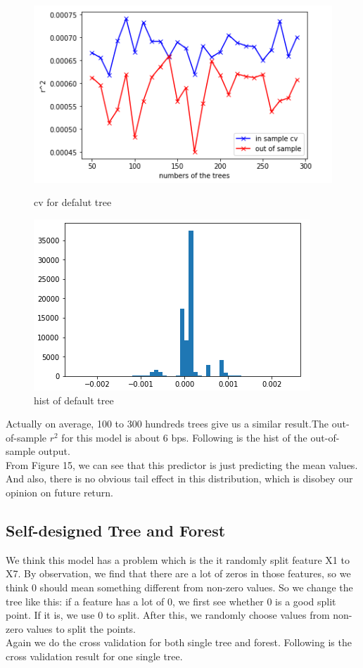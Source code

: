 \documentclass[onecolumn]{article}
\begin{document}
\begin{figure}[htbp]
\centering
\begin{minipage}[t]{0.48\textwidth}
\centering
\includegraphics[scale=0.4]{cv_and_r^2_for_forest.png}
\caption{cv for defalut tree}
\end{minipage}
\begin{minipage}[t]{0.48\textwidth}
\centering
\includegraphics[scale=0.4]{hist_of_default_.png}
\caption{hist of default tree}
\end{minipage}
\end{figure}


\indent Actually on average, 100 to 300 hundreds trees give us a similar result.The out-of-sample $r^2$ for this model is about 6 bps. Following is the hist of the out-of-sample output.\\
\indent From Figure 15, we can see that this predictor is just predicting the mean values. And also, there is no obvious tail effect in this distribution, which is disobey our opinion on future return.

\subsection{Self-designed Tree and Forest}
\indent We think this model has a problem which is the it randomly split feature X1 to X7. By observation, we find that there are a lot of zeros in those features, so we think 0 should mean something different from non-zero values. So we change the tree like this: if a feature has a lot of 0, we first see whether 0 is a good split point. If it is, we use 0 to split. After this, we randomly choose values from non-zero values to split the points.\\
\indent Again we do the cross validation for both single tree and forest. Following is the cross validation result for one single tree.
\end{document}
